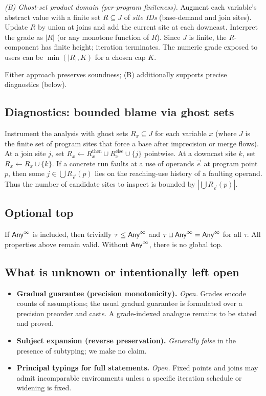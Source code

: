 \smallskip
\noindent\emph{(B) Ghost-set product domain (per-program finiteness).}
Augment each variable’s abstract value with a finite set $R\subseteq J$ of \emph{site IDs} (base-demand and join sites).
Update $R$ by union at joins and add the current site at each downcast.
Interpret the grade as $|R|$ (or any monotone function of $R$).
Since $J$ is finite, the $R$-component has finite height; iteration terminates.
The numeric grade exposed to users can be $\min(|R|,K)$ for a chosen cap $K$.

\smallskip
Either approach preserves soundness; (B) additionally supports precise diagnostics (below).

\subsection{Diagnostics: bounded blame via ghost sets}

Instrument the analysis with ghost sets $R_x\subseteq J$ for each variable $x$ (where $J$ is the finite set of program sites that force a base after imprecision or merge flows).
At a join site $j$, set $R_x \leftarrow R_x^{\mathrm{then}}\cup R_x^{\mathrm{else}}\cup\{j\}$ pointwise.
At a downcast site $k$, set $R_x \leftarrow R_x\cup\{k\}$.
If a concrete run faults at a use of operands $\vec{e}$ at program point $p$, then some $j\in \bigcup R_{\vec{e}}(p)$ lies on the reaching-use history of a faulting operand.
Thus the number of candidate sites to inspect is bounded by $|\bigcup R_{\vec{e}}(p)|$.

\subsection{Optional top}
If $\mathsf{Any}^{\infty}$ is included, then trivially $\tau\le \mathsf{Any}^{\infty}$ and $\tau\sqcup \mathsf{Any}^{\infty}=\mathsf{Any}^{\infty}$ for all $\tau$.
All properties above remain valid.
Without $\mathsf{Any}^{\infty}$, there is no global top.

\subsection{What is unknown or intentionally left open}
\begin{itemize}
\item \textbf{Gradual guarantee (precision monotonicity).} \emph{Open.}
Grades encode counts of assumptions; the usual gradual guarantee is formulated over a precision preorder and casts. A grade-indexed analogue remains to be stated and proved.
\item \textbf{Subject expansion (reverse preservation).} \emph{Generally false} in the presence of subtyping; we make no claim.
\item \textbf{Principal typings for full statements.} \emph{Open.} Fixed points and joins may admit incomparable environments unless a specific iteration schedule or widening is fixed.
\end{itemize}

